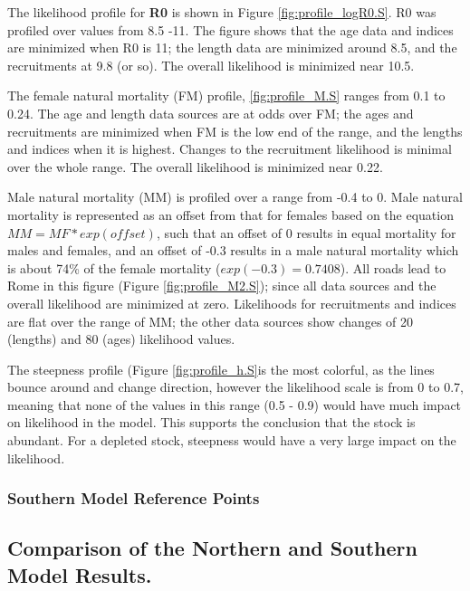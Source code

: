 \documentclass[12pt,]{article}
\begin{document}
The likelihood profile for \textbf{R0} is shown in Figure
\ref{fig:profile_logR0.S}. R0 was profiled over values from 8.5 -11. The
figure shows that the age data and indices are minimized when R0 is 11;
the length data are minimized around 8.5, and the recruitments at 9.8
(or so). The overall likelihood is minimized near 10.5.

The female natural mortality (FM) profile, \ref{fig:profile_M.S} ranges
from 0.1 to 0.24. The age and length data sources are at odds over FM;
the ages and recruitments are minimized when FM is the low end of the
range, and the lengths and indices when it is highest. Changes to the
recruitment likelihood is minimal over the whole range. The overall
likelihood is minimized near 0.22.

Male natural mortality (MM) is profiled over a range from -0.4 to 0.
Male natural mortality is represented as an offset from that for females
based on the equation \(MM = MF*exp(offset)\), such that an offset of 0
results in equal mortality for males and females, and an offset of -0.3
results in a male natural mortality which is about 74\% of the female
mortality (\(exp(-0.3) = 0.7408\)). All roads lead to Rome in this
figure (Figure \ref{fig:profile_M2.S}); since all data sources and the
overall likelihood are minimized at zero. Likelihoods for recruitments
and indices are flat over the range of MM; the other data sources show
changes of 20 (lengths) and 80 (ages) likelihood values.

The steepness profile (Figure \ref{fig:profile_h.S}is the most colorful,
as the lines bounce around and change direction, however the likelihood
scale is from 0 to 0.7, meaning that none of the values in this range
(0.5 - 0.9) would have much impact on likelihood in the model. This
supports the conclusion that the stock is abundant. For a depleted
stock, steepness would have a very large impact on the likelihood.

\subsubsection{Southern Model Reference
Points}\label{southern-model-reference-points}

\subsection{Comparison of the Northern and Southern Model
Results.}\label{comparison-of-the-northern-and-southern-model-results.}
\end{document}
